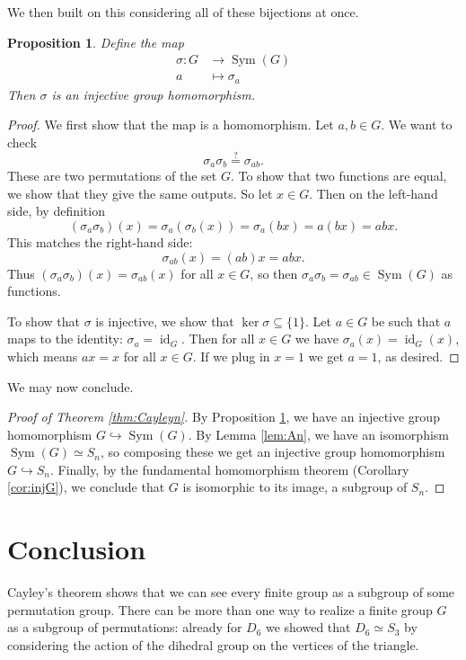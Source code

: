 \documentclass[12pt]{amsart}
\numberwithin{equation}{section}
\newtheorem{prop}[equation]{Proposition}
\theoremstyle{definition}
\theoremstyle{remark}
\numberwithin{equation}{section}
\DeclareMathOperator{\id}{id}
\DeclareMathOperator{\Sym}{Sym}
\begin{document}
We then built on this considering all of these bijections at once.

\begin{prop} \label{prop:sigmaG}
Define the map
\begin{align*}
\sigma \colon G &\to \Sym(G) \\
a &\mapsto \sigma_a 
\end{align*}
Then $\sigma$ is an injective group homomorphism.  
\end{prop}

\begin{proof}
We first show that the map is a homomorphism.  Let $a,b \in G$.  We want to check
\[ \sigma_a \sigma_b \overset{?}{=} \sigma_{ab}. \]
These are two permutations of the set $G$.  To show that two functions are equal, we show that they give the same outputs.  So let $x \in G$.  Then on the left-hand side, by definition
\[ (\sigma_a \sigma_b)(x) = \sigma_a(\sigma_b(x)) = \sigma_a(bx) = a(bx) = abx. \]
This matches the right-hand side:
\[ \sigma_{ab}(x)=(ab)x = abx. \]
Thus $(\sigma_a\sigma_b)(x)=\sigma_{ab}(x)$ for all $x \in G$, so then $\sigma_a \sigma_b = \sigma_{ab} \in \Sym(G)$ as functions.  

To show that $\sigma$ is injective, we show that $\ker \sigma \subseteq \{1\}$.  Let $a \in G$ be such that $a$ maps to the identity: $\sigma_a=\id_G$.  Then for all $x \in G$ we have $\sigma_a(x)=\id_G(x)$, which means $ax=x$ for all $x \in G$.  If we plug in $x=1$ we get $a=1$, as desired.
\end{proof}

We may now conclude.

\begin{proof}[Proof of Theorem \ref{thm:Cayleyn}]
By Proposition \ref{prop:sigmaG}, we have an injective group homomorphism $G \hookrightarrow \Sym(G)$.  By Lemma \ref{lem:An}, we have an isomorphism $\Sym(G) \simeq S_n$, so composing these we get an injective group homomorphism $G \hookrightarrow S_n$.  Finally, by the fundamental homomorphism theorem (Corollary 
\ref{cor:injG}), we conclude that $G$ is isomorphic to its image, a subgroup of $S_n$.  
\end{proof}

\section{Conclusion} \label{sec:conc}

Cayley's theorem shows that we can see every finite group as a subgroup of some permutation group.  There can be more than one way to realize a finite group $G$ as a subgroup of permutations: already for $D_6$ we showed that $D_6 \simeq S_3$ by considering the action of the dihedral group on the vertices of the triangle.  
\end{document}
